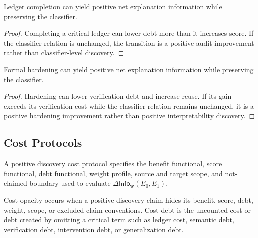 \begin{theorem}
\label{thm:philosophy-ledger-completion-positive-not-discovery}
Ledger completion can yield positive net explanation information while
preserving the classifier.
\end{theorem}
\begin{proof}
Completing a critical ledger can lower debt more than it increases
score. If the classifier relation is unchanged, the transition is a
positive audit improvement rather than classifier-level discovery.
\end{proof}

\begin{theorem}
\label{thm:philosophy-formal-hardening-positive-not-discovery}
Formal hardening can yield positive net explanation information while
preserving the classifier.
\end{theorem}
\begin{proof}
Hardening can lower verification debt and increase reuse. If its gain
exceeds its verification cost while the classifier relation remains
unchanged, it is a positive hardening improvement rather than positive
interpretability discovery.
\end{proof}

\subsection{Cost Protocols}
\label{subsec:philosophy-positive-discovery-cost-protocols}

\begin{definition}
\label{def:philosophy-positive-discovery-cost-protocol}
A positive discovery cost protocol specifies the benefit functional,
score functional, debt functional, weight profile, source and target
scope, and not-claimed boundary used to evaluate
$\Delta\mathsf{Info}_{\mathbf w}(E_0,E_1)$.
\end{definition}

\begin{definition}
\label{def:philosophy-cost-opacity-debt}
Cost opacity occurs when a positive discovery claim hides its benefit,
score, debt, weight, scope, or excluded-claim conventions. Cost debt is
the uncounted cost or debt created by omitting a critical term such as
ledger cost, semantic debt, verification debt, intervention debt, or
generalization debt.
\end{definition}

